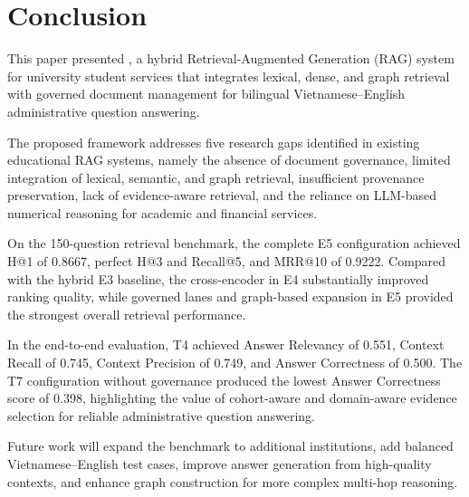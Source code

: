 \section{Conclusion}
\label{sec:conclusion}

This paper presented \textbf{\system{}}, a hybrid Retrieval-Augmented Generation (RAG) system for university student services that integrates lexical, dense, and graph retrieval with governed document management for bilingual Vietnamese--English administrative question answering.

The proposed framework addresses five research gaps identified in existing educational RAG systems, namely the absence of document governance, limited integration of lexical, semantic, and graph retrieval, insufficient provenance preservation, lack of evidence-aware retrieval, and the reliance on LLM-based numerical reasoning for academic and financial services.

On the 150-question retrieval benchmark, the complete E5 configuration achieved
H@1 of 0.8667, perfect H@3 and Recall@5, and MRR@10 of 0.9222. Compared with
the hybrid E3 baseline, the cross-encoder in E4 substantially improved ranking
quality, while governed lanes and graph-based expansion in E5 provided the
strongest overall retrieval performance.

In the end-to-end evaluation, T4 achieved Answer Relevancy of 0.551, Context
Recall of 0.745, Context Precision of 0.749, and Answer Correctness of 0.500.
The T7 configuration without governance produced the lowest Answer Correctness
score of 0.398, highlighting the value of cohort-aware and domain-aware evidence
selection for reliable administrative question answering.

Future work will expand the benchmark to additional institutions, add balanced
Vietnamese--English test cases, improve answer generation from high-quality
contexts, and enhance graph construction for more complex multi-hop reasoning.
